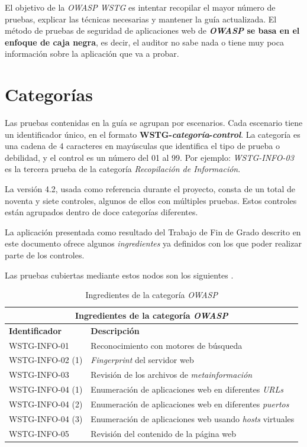 El objetivo de la \textit{OWASP WSTG} es intentar recopilar el mayor número de pruebas, explicar las técnicas necesarias y mantener la guía actualizada. El método de pruebas de seguridad de aplicaciones web de \textbf{\textit{OWASP} se basa en el enfoque de caja negra}, es decir, el auditor no sabe nada o tiene muy poca información sobre la aplicación que va a probar.

\section{Categorías} \label{sec:owaspcat}

Las pruebas contenidas en la guía se agrupan por escenarios. Cada escenario tiene un identificador único, en el formato \textbf{WSTG-\textit{categoría}-\textit{control}}. La categoría es  una cadena de 4 caracteres en mayúsculas que identifica el tipo de prueba o debilidad, y el control es un número del 01 al 99. Por ejemplo: \textit{WSTG-INFO-03} es la tercera prueba de la categoría \textit{Recopilación de Información}.\n

La versión 4.2, usada como referencia durante el proyecto, consta de un total de noventa y siete controles, algunos de ellos con múltiples pruebas. Estos controles están agrupados dentro de doce categorías diferentes.\sn

La aplicación presentada como resultado del Trabajo de Fin de Grado descrito en este documento ofrece algunos \textit{ingredientes} ya definidos con los que poder realizar parte de los controles.\sn

Las pruebas cubiertas mediante estos nodos son los siguientes .\sn

\begin{table}[H]
    \centering
    \begin{tabularx}{\textwidth}{| l | X |}
        \hline
        \multicolumn{2}{c}{ \textbf{Ingredientes de la categoría \textit{OWASP}} } \\ \hline
        \textbf{Identificador} & \textbf{Descripción} \\ \hline
        WSTG-INFO-01 & Reconocimiento con motores de búsqueda \\ \hline
        WSTG-INFO-02 (1) & \textit{Fingerprint} del servidor web \\ \hline
        WSTG-INFO-03 & Revisión de los archivos de \textit{metainformación} \\ \hline
        WSTG-INFO-04 (1) & Enumeración de aplicaciones web en diferentes \textit{URLs} \\ \hline
        WSTG-INFO-04 (2) & Enumeración de aplicaciones web en diferentes \textit{puertos} \\ \hline
        WSTG-INFO-04 (3) & Enumeración de aplicaciones web usando \textit{hosts} virtuales \\ \hline
        WSTG-INFO-05 & Revisión del contenido de la página web \\ \hline
    \end{tabularx}
    \caption{Ingredientes de la categoría \textit{OWASP}}
    \label{tab:owaspingredients}
\end{table}

